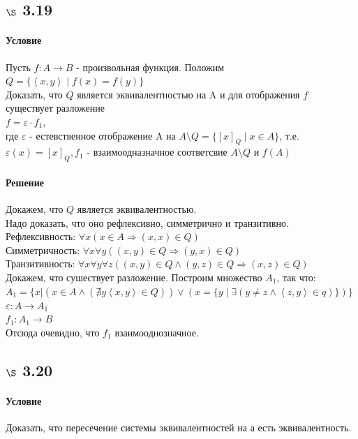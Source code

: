 \documentclass[a4paper,12pt]{article}
\begin{document}
\subsection*{$\S$ 3.19}
\paragraph*{Условие}
Пусть $ f: A \rightarrow B $ - произвольная функция. Положим\\
$ Q = \{\left\langle x, y \right\rangle \mid f(x)=f(y)  \}$\\
Доказать, что $Q$ является эквивалентностью на A и для отображения $ f $ существует разложение\\
$ f = \varepsilon \cdot f_1 $, \\
где $ \varepsilon $ - естевственное отображение A на $A \setminus Q = \{ [x]_Q \mid x \in A\}$, т.е. \\
$ \varepsilon (x) =[x]_Q , f_1 $ - взаимоодназначное соответсвие $ A \setminus Q$ и $f(A)$
\paragraph*{Решение}
Докажем, что $ Q $ является эквивалентностью.\\
Надо доказать, что оно рефлексивно, симметрично и транзитивно.\\
Рефлексивность: $ \forall x ( x \in A \Rightarrow (x,x) \in Q )$\\
Симметричность: $ \forall x \forall y ((x, y) \in Q \Rightarrow (y, x) \in Q)$\\
Транзитивность: $ \forall x \forall y \forall z ((x, y) \in Q \wedge (y, z) \in Q \Rightarrow (x, z) \in Q)$\\
Докажем, что сушествует разложение. Построим множество $A_1$, так что:\\
$ A_1 = \{  x | (x \in A \wedge ( \nexists y \left\langle x, y \right\rangle \in Q ) ) \vee ( x = \{ y \mid \exists ( y \neq z \wedge \left\langle z, y \right\rangle \in q )  \} ) \} $\\
$  \varepsilon : A \rightarrow A_1 $\\
$ f_1: A_1 \rightarrow B$\\
Отсюда очевидно, что $ f_1 $ взаимооднозначное.
 
\subsection*{$\S$ 3.20}
\paragraph*{Условие}
Доказать, что пересечение системы эквивалентностей на а есть эквивалентность.
\end{document}
